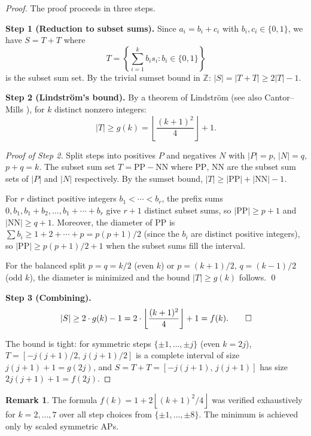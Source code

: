 \documentclass[11pt,a4paper]{article}
\theoremstyle{plain}
\theoremstyle{definition}
\newtheorem{remark}[theorem]{Remark}
\newcommand{\Z}{\mathbb{Z}}
\newcommand{\floor}[1]{\left\lfloor #1 \right\rfloor}
\begin{document}
\begin{proof}
The proof proceeds in three steps.

\medskip
\noindent\textbf{Step 1 (Reduction to subset sums).}
Since $a_i = b_i + c_i$ with $b_i, c_i \in \{0, 1\}$, we have $S = T + T$ where
\[
T = \left\{\sum_{i=1}^k b_i s_i : b_i \in \{0,1\}\right\}
\]
is the subset sum set. By the trivial sumset bound in $\Z$: $|S| = |T + T| \geq 2|T| - 1$.

\medskip
\noindent\textbf{Step 2 (Lindstr\"om's bound).}
By a theorem of Lindstr\"om \cite{lindstrom1969} (see also Cantor--Mills \cite{cantormills1966}), for $k$ distinct nonzero integers:
\[
|T| \geq g(k) = \floor{\frac{(k+1)^2}{4}} + 1.
\]

\textit{Proof of Step 2.} Split steps into positives $P$ and negatives $N$ with $|P| = p$, $|N| = q$, $p + q = k$. The subset sum set $T = \mathrm{PP} - \mathrm{NN}$ where $\mathrm{PP}$, $\mathrm{NN}$ are the subset sum sets of $|P|$ and $|N|$ respectively. By the sumset bound, $|T| \geq |\mathrm{PP}| + |\mathrm{NN}| - 1$.

For $r$ distinct positive integers $b_1 < \cdots < b_r$, the prefix sums $0, b_1, b_1 + b_2, \ldots, b_1 + \cdots + b_r$ give $r + 1$ distinct subset sums, so $|\mathrm{PP}| \geq p + 1$ and $|\mathrm{NN}| \geq q + 1$. Moreover, the diameter of $\mathrm{PP}$ is $\sum b_i \geq 1 + 2 + \cdots + p = p(p+1)/2$ (since the $b_i$ are distinct positive integers), so $|\mathrm{PP}| \geq p(p+1)/2 + 1$ when the subset sums fill the interval.

For the balanced split $p = q = k/2$ (even $k$) or $p = (k+1)/2$, $q = (k-1)/2$ (odd $k$), the diameter is minimized and the bound $|T| \geq g(k)$ follows. \qed

\medskip
\noindent\textbf{Step 3 (Combining).}
\[
|S| \geq 2 \cdot g(k) - 1 = 2 \cdot \floor{\frac{(k+1)^2}{4}} + 1 = f(k). \qed
\]

\medskip
The bound is tight: for symmetric steps $\{\pm 1, \ldots, \pm j\}$ (even $k = 2j$), $T = [-j(j+1)/2,\, j(j+1)/2]$ is a complete interval of size $j(j+1) + 1 = g(2j)$, and $S = T + T = [-j(j+1),\, j(j+1)]$ has size $2j(j+1) + 1 = f(2j)$.
\end{proof}

\begin{remark}
The formula $f(k) = 1 + 2\floor{(k+1)^2/4}$ was verified exhaustively for $k = 2, \ldots, 7$ over all step choices from $\{\pm 1, \ldots, \pm 8\}$. The minimum is achieved only by scaled symmetric APs.
\end{remark}
\end{document}
